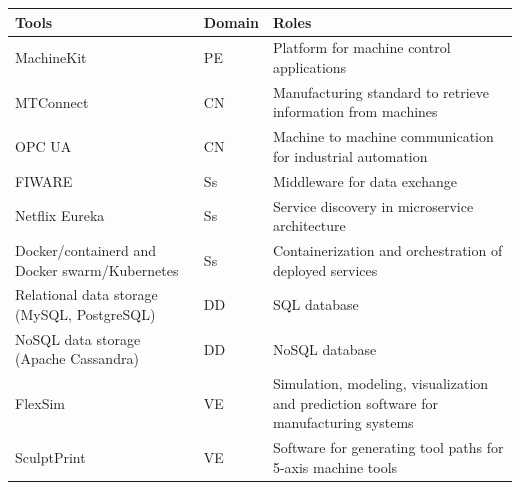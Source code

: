 \documentclass[article,table]{aaltoseries}
\begin{document}
\begin{table}[]
	\begin{tabular}{|p{3.8cm}|p{1.5cm}|p{5.8cm}|}
		\hline
		\rowcolor[HTML]{C0C0C0} 
		Tools                                                        & Domain & Roles                                                                                   \\ \hline
		MachineKit                                                   & PE             & Platform for machine control applications                                               \\ \hline
		MTConnect                                                    & CN             & Manufacturing standard to retrieve information from machines                            \\ \hline
		OPC UA                                                       & CN             & Machine to machine communication for industrial automation                              \\ \hline
		FIWARE                                                       & Ss             & Middleware for data exchange                                                            \\ \hline
		Netflix Eureka                                               & Ss             & Service discovery in microservice architecture                                          \\ \hline
		Docker/containerd and Docker swarm/Kubernetes                & Ss             & Containerization and orchestration of deployed services                                 \\ \hline
		Relational data storage (MySQL, PostgreSQL)                  & DD             & SQL database                                                                            \\ \hline
		NoSQL data storage (Apache Cassandra)                        & DD             & NoSQL database                                                                          \\ \hline
		FlexSim                                                      & VE             & Simulation, modeling, visualization and prediction software for manufacturing systems \\ \hline
		SculptPrint                                                  & VE             & Software for generating tool paths for 5-axis machine tools                             \\ \hline

\end{tabular}
\end{table}
\end{document}
